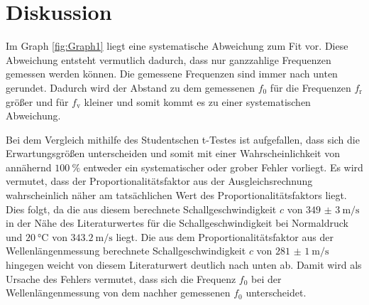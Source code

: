 
\section{Diskussion}
\label{sec:Diskussion}



Im Graph \ref{fig:Graph1} liegt eine systematische Abweichung zum Fit vor. Diese Abweichung entsteht vermutlich dadurch, dass nur ganzzahlige Frequenzen gemessen werden können. Die gemessene Frequenzen sind immer nach unten gerundet. Dadurch wird der Abstand zu dem gemessenen $f_0$ für die Frequenzen $f_\text{r}$ größer und für $f_\text{v}$ kleiner und somit kommt es zu einer systematischen Abweichung.


Bei dem Vergleich mithilfe des Studentschen t-Testes ist aufgefallen, dass sich die Erwartungsgrößen unterscheiden und somit mit einer Wahrscheinlichkeit von annähernd $\SI{100}{\percent}$ entweder ein systematischer oder grober Fehler vorliegt. Es wird vermutet, dass der Proportionalitätsfaktor aus der Ausgleichsrechnung wahrscheinlich näher am tatsächlichen Wert des Proportionalitätsfaktors liegt. Dies folgt, da die aus diesem berechnete Schallgeschwindigkeit $c$ von $\SI{349(3)}{\meter\per\second}$ in der Nähe des Literaturwertes für die Schallgeschwindigkeit bei Normaldruck und $\SI{20}{\celsius}$ von $\SI{343.2}{\meter\per\second}$ \cite{c} liegt. Die aus dem Proportionalitätsfaktor aus der Wellenlängenmessung berechnete Schallgeschwindigkeit $c$ von $\SI{281(1)}{\meter\per\second}$ hingegen weicht von diesem Literaturwert deutlich nach unten ab. Damit wird als Ursache des Fehlers vermutet, dass sich die Frequenz $f_0$ bei der Wellenlängenmessung von dem nachher gemessenen $f_0$ unterscheidet.
